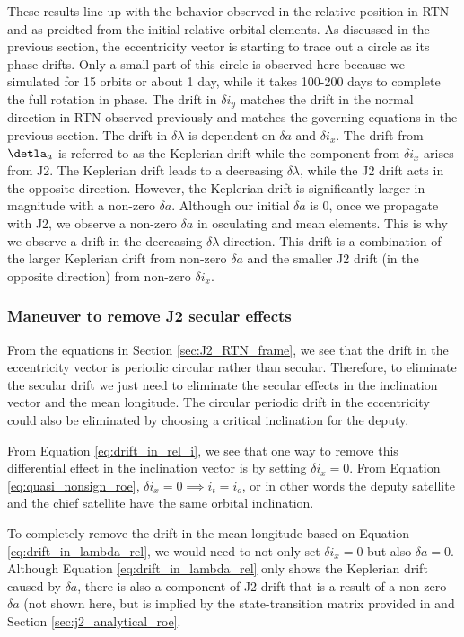 These results line up with the behavior observed in the relative position in RTN and as preidted from the initial relative orbital elements. As discussed in the previous section, the eccentricity vector is starting to trace out a circle as its phase drifts. Only a small part of this circle is observed here because we simulated for 15 orbits or about 1 day, while it takes 100-200 days to complete the full rotation in phase. The drift in $\delta i_y$ matches the drift in the normal direction in RTN observed previously and matches the governing equations in the previous section. The drift in $\delta \lambda$ is dependent on $\delta a$ and $\delta i_x$. The drift from $\detla_a$ is referred to as the Keplerian drift while the component from $\delta i_x$ arises from J2. The Keplerian drift leads to a decreasing $\delta \lambda$, while the J2 drift acts in the opposite direction. However, the Keplerian drift is significantly larger in magnitude with a non-zero $\delta a$. Although our initial $\delta a$ is 0, once we propagate with J2, we observe a non-zero $\delta a$ in osculating and mean elements. This is why we observe a drift in the decreasing $\delta \lambda$ direction. This drift is a combination of the larger Keplerian drift from non-zero $\delta a$ and the smaller J2 drift (in the opposite direction) from non-zero $\delta i_x$.

\subsubsection{Maneuver to remove J2 secular effects}\label{sec:J2_maneuver}
From the equations in Section \ref{sec:J2_RTN_frame}, we see that the drift in the eccentricity vector is periodic circular rather than secular. Therefore, to eliminate the secular drift we just need to eliminate the secular effects in the inclination vector and the mean longitude. The circular periodic drift in the eccentricity could also be eliminated by choosing a critical inclination for the deputy. 

From Equation \ref{eq:drift_in_rel_i}, we see that one way to remove this differential effect in the inclination vector is by setting $\delta i_x = 0$. From Equation \ref{eq:quasi_nonsign_roe}, $\delta i_x = 0 \implies i_t = i_o$, or in other words the deputy satellite and the chief satellite have the same orbital inclination. 

To completely remove the drift in the mean longitude based on Equation \ref{eq:drift_in_lambda_rel}, we would need to not only set $\delta i_x = 0$ but also  $\delta a = 0$. Although Equation \ref{eq:drift_in_lambda_rel} only shows the Keplerian drift caused by $\delta a$, there is also a component of J2 drift that is a result of a non-zero $\delta a$ (not shown here, but is implied by the state-transition matrix provided in \cite{koenig2017new} and Section \ref{sec:j2_analytical_roe}. 

